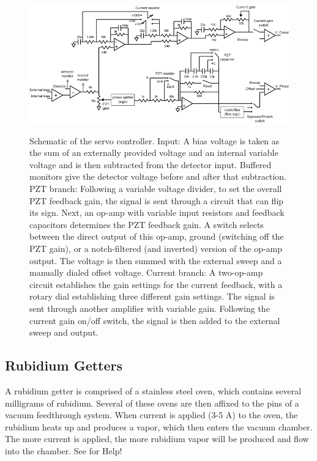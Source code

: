 \documentclass{../lab}
\begin{document}
\begin{figure}[h]
    \centering
    \href{http://experimentationlab.berkeley.edu/sites/default/files/images/Electronics_schematic_v2.png}{\includegraphics[width=0.7\linewidth]{images/Electronics_schematic_v2.png}}
    \caption{Schematic of the servo controller. Input: A bias voltage is taken as the sum of an externally provided voltage and an internal variable voltage and is then subtracted from the detector input. Buffered monitors give the detector voltage before and after that subtraction. PZT branch: Following a variable voltage divider, to set the overall PZT feedback gain, the signal is sent through a circuit that can flip its sign. Next, an op-amp with variable input resistors and feedback capacitors determines the PZT feedback gain. A switch selects between the direct output of this op-amp, ground (switching off the PZT gain), or a notch-filtered (and inverted) version of the op-amp output. The voltage is then summed with the external sweep and a manually dialed offset voltage. Current branch: A two-op-amp circuit establishes the gain settings for the current feedback, with a rotary dial establishing three different gain settings. The signal is sent through another amplifier with variable gain. Following the current gain on/off switch, the signal is then added to the external sweep and output.}
    \label{fig:SchematicOfServoController}
\end{figure}

\subsection{Rubidium Getters}

A rubidium getter is comprised of a stainless steel oven, which contains several milligrams of rubidium. Several of these ovens are then affixed to the pins of a vacuum feedthrough system. When current is applied (3-5 A) to the oven, the rubidium heats up and produces a vapor, which then enters the vacuum chamber. The more current is applied, the more rubidium vapor will be produced and flow into the chamber. See \LabEngineer for Help!
\end{document}
